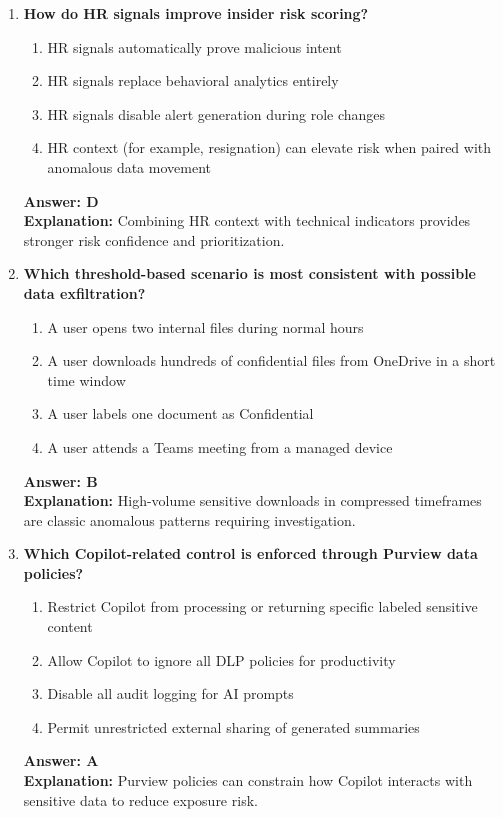 \documentclass[10pt]{article}
\begin{document}
\begin{enumerate}[leftmargin=*]
\item \textbf{How do HR signals improve insider risk scoring?}
\begin{enumerate}[label=\Alph*.]
  \item HR signals automatically prove malicious intent
  \item HR signals replace behavioral analytics entirely
  \item HR signals disable alert generation during role changes
  \item HR context (for example, resignation) can elevate risk when paired with anomalous data movement
\end{enumerate}
\textbf{Answer: D}\\
\textbf{Explanation:} Combining HR context with technical indicators provides stronger risk confidence and prioritization.

\item \textbf{Which threshold-based scenario is most consistent with possible data exfiltration?}
\begin{enumerate}[label=\Alph*.]
  \item A user opens two internal files during normal hours
  \item A user downloads hundreds of confidential files from OneDrive in a short time window
  \item A user labels one document as Confidential
  \item A user attends a Teams meeting from a managed device
\end{enumerate}
\textbf{Answer: B}\\
\textbf{Explanation:} High-volume sensitive downloads in compressed timeframes are classic anomalous patterns requiring investigation.

\item \textbf{Which Copilot-related control is enforced through Purview data policies?}
\begin{enumerate}[label=\Alph*.]
  \item Restrict Copilot from processing or returning specific labeled sensitive content
  \item Allow Copilot to ignore all DLP policies for productivity
  \item Disable all audit logging for AI prompts
  \item Permit unrestricted external sharing of generated summaries
\end{enumerate}
\textbf{Answer: A}\\
\textbf{Explanation:} Purview policies can constrain how Copilot interacts with sensitive data to reduce exposure risk.


\end{enumerate}
\end{document}

